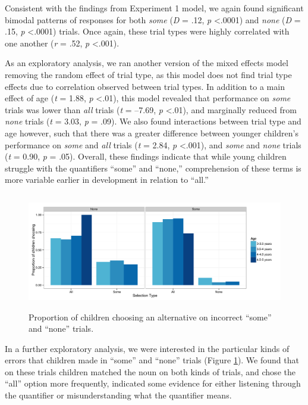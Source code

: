 \documentclass[man]{apa2}
\begin{document}
Consistent with the findings from Experiment 1 model, we again found significant bimodal patterns of responses for both \textit{some} (\textit{D} = .12, \textit{p} \textless  .0001) and \textit{none} (\textit{D} = .15, \textit{p} \textless  .0001) trials. Once again, these trial types were highly correlated with one another (\textit{r} = .52, \textit{p} \textless  .001). 

As an exploratory analysis, we ran another version of the mixed effects model removing the random effect of trial type, as this model does not find trial type effects due to correlation observed between trial types. In addition to a main effect of age (\textit{t} = 1.88, \textit{p} \textless  .01), this model revealed that performance on \textit{some} trials was lower than \textit{all} trials (\textit{t} = --7.69, \textit{p} \textless  .01), and marginally reduced from \textit{none} trials (\textit{t} = 3.03, \textit{p} = .09). We also found interactions between trial type and age however, such that there was a greater difference between younger children's performance on \textit{some} and \textit{all} trials (\textit{t} = 2.84, \textit{p} \textless  .001), and \textit{some} and \textit{none} trials (\textit{t} = 0.90, \textit{p} = .05). Overall, these findings indicate that while young children struggle with the quantifiers ``some'' and ``none,'' comprehension of these terms is more variable earlier in development in relation to ``all.'' 

\begin{figure} 
 \begin{center} 
  \includegraphics[height=2in]{figures/exp2_wrong.pdf} 
  \caption{\label{fig:exp2_wrong} Proportion of children choosing an alternative on incorrect ``some'' and ``none'' trials.} 
 \end{center} 
\end{figure}

In a further exploratory analysis, we were interested in the particular kinds of errors that children made in ``some'' and ``none'' trials (Figure \ref{fig:exp2_wrong}). We found that on these trials children matched the noun on both kinds of trials, and chose the ``all'' option more frequently, indicated some evidence for either listening through the quantifier or misunderstanding what the quantifier means. 
\end{document}
